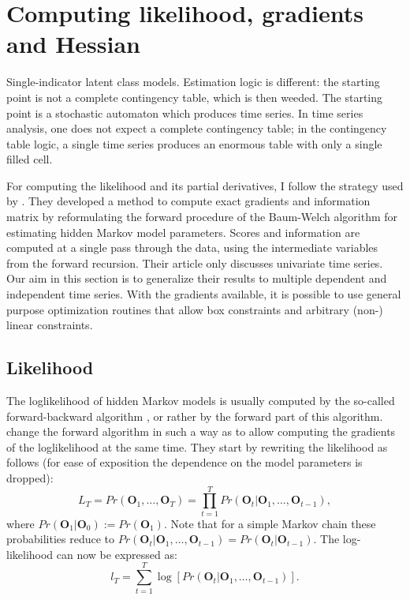 \documentclass[a4paper,12pt,doc]{apaIngmar} %
\newcommand{\citep}{\cite}
\newcommand{\vc}{\mathbf}
\begin{document}
\section{Computing likelihood, gradients and Hessian}

Single-indicator latent class models.  Estimation logic is different:
the starting point is not a complete contingency table, which is then
weeded.  The starting point is a stochastic automaton which produces
time series.  In time series analysis, one does not expect a complete
contingency table; in the contingency table logic, a single time
series produces an enormous table with only a single filled cell.

For computing the likelihood and its partial derivatives, I follow the
strategy used by \cite{Lystig2002}.  They developed a method to
compute exact gradients and information matrix by reformulating the
forward procedure of the Baum-Welch algorithm for estimating hidden
Markov model parameters.  Scores and information are computed at a
single pass through the data, using the intermediate variables from
the forward recursion.  Their article only discusses univariate time
series.  Our aim in this section is to generalize their results to
multiple dependent and independent time series.  With the gradients
available, it is possible to use general purpose optimization routines
that allow box constraints and arbitrary (non-) linear constraints.


\subsection{Likelihood}

The loglikelihood of hidden Markov models is usually computed by the
so-called forward-backward algorithm \citep{Baum1966,Rabiner1989}, or
rather by the forward part of this algorithm.  \cite{Lystig2002}
change the forward algorithm in such a way as to allow computing the
gradients of the loglikelihood at the same time.  They start by
rewriting the likelihood as follows (for ease of exposition the
dependence on the model parameters is dropped):
\begin{equation}
	L_{T} = Pr(\vc{O}_{1}, \ldots, \vc{O}_{T}) = \prod_{t=1}^{T}
	Pr(\vc{O}_{t}|\vc{O}_{1}, \ldots, \vc{O}_{t-1}),
	\label{condLike}
\end{equation}
where $Pr(\vc{O}_{1}|\vc{O}_{0}):=Pr(\vc{O}_{1})$.  Note that for a
simple Markov chain these probabilities reduce to
$Pr(\vc{O}_{t}|\vc{O}_{1},\ldots, \vc{O}_{t-1}) =
Pr(\vc{O}_{t}|\vc{O}_{t-1})$.  The log-likelihood can now be expressed
as:
\begin{equation}
	l_{T} = \sum_{t=1}^{T} \log[Pr(\vc{O}_{t}|\vc{O}_{1}, \ldots,
	\vc{O}_{t-1})].
	\label{eq:condLogl}
\end{equation}
\end{document}
